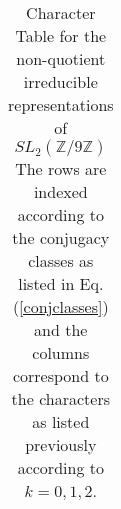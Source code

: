 \documentclass[12pt,reqno]{amsart}
\theoremstyle{remark}
\numberwithin{table}{section}
\newcommand{\Z}{\mathbb Z}
\begin{document}
\begin{center}
\begin{table}[!htbp]
\begin{tabular}{c}
\end{tabular}\caption{Character Table for the non-quotient irreducible representations of $SL_2(\Z/9\Z)$ The rows are indexed according to the conjugacy classes as listed in Eq. (\ref{conjclasses}) and the columns correspond to the characters as listed previously according to $k= 0,1,2$.}

\end{table}
\end{center}
\end{document}
